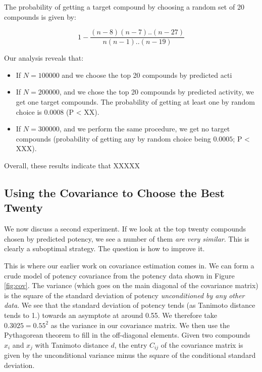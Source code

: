 \documentclass[journal=jacsat,manuscript=article]{achemso}
\begin{document}
The probability of getting a target compound by choosing a random set of 20 compounds is given by:

\begin{equation}
    1-\frac{(n-8)(n-7)..(n-27)}{n(n-1)..(n-19)}
\end{equation}

Our analysis reveals that:
\begin{itemize}
    \item If $N=100000$ and we choose the top 20 compounds by predicted acti
    \item If $N=200000$, and we chose the top 20 compounds by predicted activity, we get one target compounds.  The probability of getting at least one by random choice is $0.0008$ (P < XX).
    \item If $N=300000$, and we perform the same procedure, we get no target compounds (probability of getting any by random choice being $0.0005$; P < XXX).  
\end{itemize}

Overall, these results indicate that XXXXX

\subsection*{Using the Covariance to Choose the Best Twenty}
We now discuss a second experiment.  If we look at the top twenty compounds chosen by predicted potency, we see a number of them \textit{are very similar}.  This is clearly a suboptimal strategy. The question is how to improve it.

This is where our earlier work on covariance estimation comes in.  We can form a crude model of potency covariance from the potency data shown in Figure \ref{fig:cov}.  The variance (which goes on the main diagonal of the covariance matrix) is the square of the standard deviation of potency \textit{unconditioned by any other data}.  We see that the standard deviation of potency tends (as Tanimoto distance tends to 1.) towards an asymptote at around 0.55.  We therefore take $0.3025 = 0.55^2$ as the variance in our covariance matrix.  We then use the Pythagorean theorem to fill in the off-diagonal elements.  Given two compounds $x_i$ and $x_j$ with Tanimoto distance $d$, the entry $C_{ij}$ of the covariance matrix is given by the unconditional variance minus the square of the conditional standard deviation.
\end{document}
